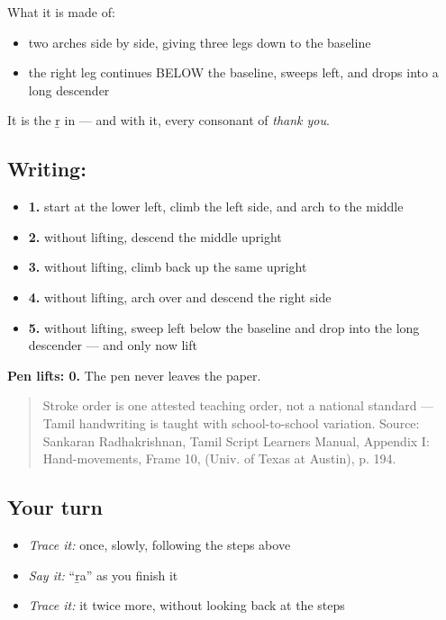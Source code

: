 What it is made of:

\begin{itemize}
\raggedright
  \item two arches side by side, giving three legs down to the baseline
  \item the right leg continues BELOW the baseline, sweeps left, and drops into a long descender
\end{itemize}

It is the ṟ in  — and with it, every consonant of \emph{thank you}.

\subsection*{Writing: }

\begin{itemize}
\raggedright
  \item \textbf{1.} start at the lower left, climb the left side, and arch to the middle
  \item \textbf{2.} without lifting, descend the middle upright
  \item \textbf{3.} without lifting, climb back up the same upright
  \item \textbf{4.} without lifting, arch over and descend the right side
  \item \textbf{5.} without lifting, sweep left below the baseline and drop into the long descender — and only now lift
\end{itemize}

\textbf{Pen lifts: 0.} The pen never leaves the paper.

\begin{quote}
Stroke order is one attested teaching order, not a national standard — Tamil handwriting is taught with school-to-school variation. Source: Sankaran Radhakrishnan, Tamil Script Learners Manual, Appendix I: Hand-movements, Frame 10,  (Univ. of Texas at Austin), p. 194.
\end{quote}

\subsection*{Your turn}
\begin{itemize}
\raggedright
  \item \emph{Trace it:}  once, slowly, following the steps above
  \item \emph{Say it:} \textquotedblleft{}ṟa\textquotedblright{} as you finish it
  \item \emph{Trace it:} it twice more, without looking back at the steps
\end{itemize}


